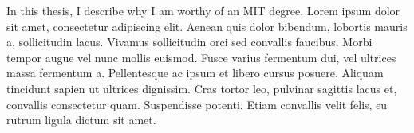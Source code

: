 % 
% 
%

In this thesis, I describe why I am worthy of an MIT degree.  Lorem ipsum dolor sit amet, consectetur adipiscing elit. Aenean quis dolor bibendum, lobortis mauris a, sollicitudin lacus. Vivamus sollicitudin orci sed convallis faucibus. Morbi tempor augue vel nunc mollis euismod. Fusce varius fermentum dui, vel ultrices massa fermentum a. Pellentesque ac ipsum et libero cursus posuere. Aliquam tincidunt sapien ut ultrices dignissim. Cras tortor leo, pulvinar sagittis lacus et, convallis consectetur quam. Suspendisse potenti. Etiam convallis velit felis, eu rutrum ligula dictum sit amet.

